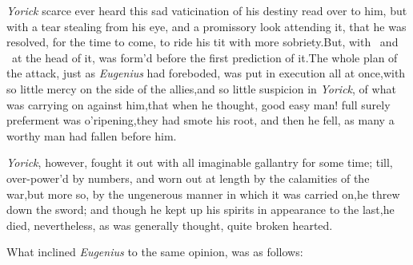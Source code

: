 \documentclass{article}
\begin{document}
\textit{Yorick} scarce ever heard this sad vaticination of his
destiny read over to him, but with a tear stealing from his eye,
and a promissory look attending it, that he was resolved, for the
time to come, to ride his tit with more sobriety.\tsh  But,
with \astv\ and \astv\ at the 
head of it, was form’d before the first prediction of it.\tsk  The
whole plan of the attack, just as \textit{Eugenius} had foreboded,
was put in execution all at once,\tsk  with so little mercy on the side of the allies,\tsk  and so little
suspicion in \textit{Yorick}, of what was carrying on against
him,\tsk  that when he thought, good easy man! full surely
preferment was o’ripening,\tsk  they had smote his root, and
then he fell, as many a worthy man had fallen before him.

\textit{Yorick}, however, fought it out with all imaginable
gallantry for some time; till, over-power’d by numbers, and worn out
at length by the calamities of the war,\tsk  but more so, by the
ungenerous manner in which it was carried on,\tsk  he threw down
the sword; and though he kept up his spirits in appearance to the
last,\tsk he died, nevertheless, as was gene\-rally thought, quite
broken hearted.

What inclined \textit{Eugenius} to the same opinion, was as
follows:
\end{document}
